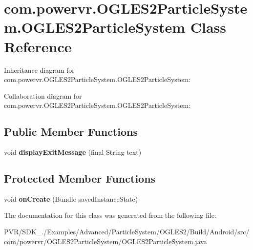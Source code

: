 \hypertarget{classcom_1_1powervr_1_1_o_g_l_e_s2_particle_system_1_1_o_g_l_e_s2_particle_system}{\section{com.\+powervr.\+O\+G\+L\+E\+S2\+Particle\+System.\+O\+G\+L\+E\+S2\+Particle\+System Class Reference}
\label{classcom_1_1powervr_1_1_o_g_l_e_s2_particle_system_1_1_o_g_l_e_s2_particle_system}
}


Inheritance diagram for com.\+powervr.\+O\+G\+L\+E\+S2\+Particle\+System.\+O\+G\+L\+E\+S2\+Particle\+System\+:


Collaboration diagram for com.\+powervr.\+O\+G\+L\+E\+S2\+Particle\+System.\+O\+G\+L\+E\+S2\+Particle\+System\+:
\subsection*{Public Member Functions}
\begin{DoxyCompactItemize}
\item 
\hypertarget{classcom_1_1powervr_1_1_o_g_l_e_s2_particle_system_1_1_o_g_l_e_s2_particle_system_a8996d2e8ba3fe78445d86f0e0c281b49}{void {\bfseries display\+Exit\+Message} (final String text)}\label{classcom_1_1powervr_1_1_o_g_l_e_s2_particle_system_1_1_o_g_l_e_s2_particle_system_a8996d2e8ba3fe78445d86f0e0c281b49}

\end{DoxyCompactItemize}
\subsection*{Protected Member Functions}
\begin{DoxyCompactItemize}
\item 
\hypertarget{classcom_1_1powervr_1_1_o_g_l_e_s2_particle_system_1_1_o_g_l_e_s2_particle_system_aad1f94478b5fa16cc15841b0bb09b810}{void {\bfseries on\+Create} (Bundle saved\+Instance\+State)}\label{classcom_1_1powervr_1_1_o_g_l_e_s2_particle_system_1_1_o_g_l_e_s2_particle_system_aad1f94478b5fa16cc15841b0bb09b810}

\end{DoxyCompactItemize}


The documentation for this class was generated from the following file\+:\begin{DoxyCompactItemize}
\item 
P\+V\+R/\+S\+D\+K\+\_./\+Examples/\+Advanced/\+Particle\+System/\+O\+G\+L\+E\+S2/\+Build/\+Android/src/com/powervr/\+O\+G\+L\+E\+S2\+Particle\+System/O\+G\+L\+E\+S2\+Particle\+System.\+java\end{DoxyCompactItemize}
